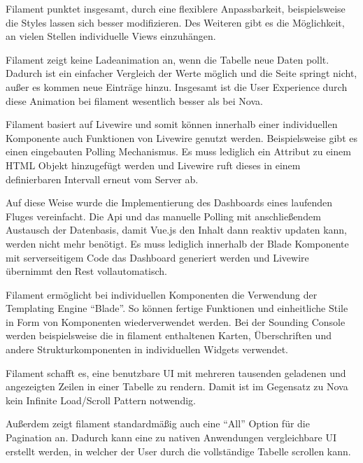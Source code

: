 \newpage

Filament punktet insgesamt, durch eine flexiblere Anpassbarkeit, beispielsweise die Styles lassen sich besser modifizieren.
Des Weiteren gibt es die Möglichkeit, an vielen Stellen individuelle Views einzuhängen.

Filament zeigt keine Ladeanimation an, wenn die Tabelle neue Daten pollt.
Dadurch ist ein einfacher Vergleich der Werte möglich und die Seite springt nicht, außer es kommen neue Einträge hinzu.
Insgesamt ist die User Experience durch diese Animation bei filament wesentlich besser als bei Nova.

Filament basiert auf Livewire\cite{livewire} und somit können innerhalb einer individuellen Komponente auch Funktionen von Livewire genutzt werden.
Beispielsweise gibt es einen eingebauten Polling Mechanismus.
Es muss lediglich ein Attribut zu einem HTML Objekt hinzugefügt werden und Livewire ruft dieses in einem definierbaren Intervall erneut vom Server ab.

Auf diese Weise wurde die Implementierung des Dashboards eines laufenden Fluges vereinfacht.
Die Api und das manuelle Polling mit anschließendem Austausch der Datenbasis, damit Vue.js den Inhalt dann reaktiv updaten kann, werden nicht mehr benötigt.
Es muss lediglich innerhalb der Blade Komponente mit serverseitigem Code das Dashboard generiert werden und Livewire übernimmt den Rest vollautomatisch.

\newpage

Filament ermöglicht bei individuellen Komponenten die Verwendung der Templating Engine \enquote{Blade}.
So können fertige Funktionen und einheitliche Stile in Form von Komponenten wiederverwendet werden.
Bei der Sounding Console werden beispielsweise die in filament enthaltenen Karten, Überschriften und andere Strukturkomponenten in individuellen Widgets verwendet.

Filament schafft es, eine benutzbare UI mit mehreren tausenden geladenen und angezeigten Zeilen in einer Tabelle zu rendern.
Damit ist im Gegensatz zu Nova kein Infinite Load/Scroll Pattern notwendig.

Außerdem zeigt filament standardmäßig auch eine \enquote{All} Option für die Pagination an.
Dadurch kann eine zu nativen Anwendungen vergleichbare UI erstellt werden, in welcher der User durch die vollständige Tabelle scrollen kann.

